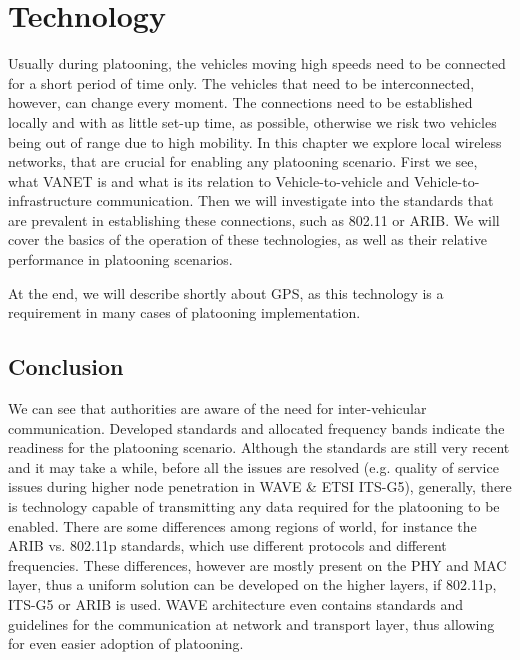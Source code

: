 \section{Technology}\label{sec:technology}

Usually during platooning, the vehicles moving high speeds need to be connected for a short period of time only. The vehicles that need to be interconnected, however, can change every moment. The connections need to be established locally and with as little set-up time, as possible, otherwise we risk two vehicles being out of range due to high mobility. In this chapter we explore local wireless networks, that are crucial for enabling any platooning scenario. First we see, what VANET is and what is its relation to Vehicle-to-vehicle and Vehicle-to-infrastructure communication. Then we will investigate into the standards that are prevalent in establishing these connections, such as 802.11 or ARIB. We will cover the basics of the operation of these technologies, as well as their relative performance in platooning scenarios.\par
% 
At the end, we will describe shortly about GPS, as this technology is a requirement in many cases of platooning implementation.









\subsection{Conclusion}

We can see that authorities are aware of the need for inter-vehicular communication. Developed standards and allocated frequency bands indicate the readiness for the platooning scenario. Although the standards are still very recent and it may take a while, before all the issues are resolved (e.g. quality of service issues during higher node penetration in WAVE \& ETSI ITS-G5), generally, there is technology capable of transmitting any data required for the platooning to be enabled. There are some differences among regions of world, for instance the ARIB vs. 802.11p standards, which use different protocols and different frequencies. These differences, however are mostly present on the PHY and MAC layer, thus a uniform solution can be developed on the higher layers, if 802.11p, ITS-G5 or ARIB is used. WAVE architecture even contains standards and guidelines for the communication at network and transport layer, thus allowing for even easier adoption of platooning.